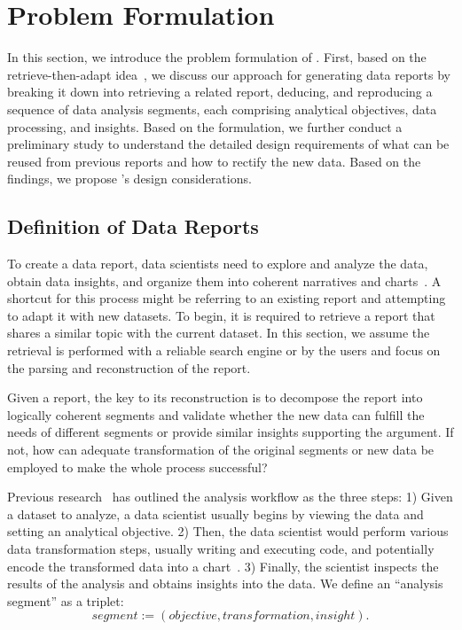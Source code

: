 

\section{Problem Formulation}

In this section, we introduce the problem formulation of \system{}. 
First, based on the retrieve-then-adapt idea~\cite{qian2020retrieve}, we discuss our approach for generating data reports by breaking it down into retrieving a related report, deducing, and reproducing a sequence of data analysis segments, each comprising analytical objectives, data processing, and insights.
Based on the formulation, we further conduct a preliminary study to understand the detailed design requirements of what can be reused from previous reports and how to rectify the new data. 
Based on the findings, we propose \system{}'s design considerations.

\subsection{Definition of Data Reports}
\label{subsec:problem_formulation}

To create a data report, data scientists need to explore and analyze the data, obtain data insights, and organize them into coherent narratives and charts~\cite{li2023wherearewesofar}. 
A shortcut for this process might be referring to an existing report and attempting to adapt it with new datasets.
To begin, it is required to retrieve a report that shares a similar topic with the current dataset.
In this section, we assume the retrieval is performed with a reliable search engine or by the users and focus on the parsing and reconstruction of the report.

Given a report, the key to its reconstruction is to decompose the report into logically coherent segments and validate whether the new data can fulfill the needs of different segments or provide similar insights supporting the argument. 
If not, how can adequate transformation of the original segments or new data be employed to make the whole process successful? 

Previous research~\cite{bar2020automatically, li2023edassistant, batch2017interactive} has outlined the analysis workflow as the three steps: 
1) Given a dataset to analyze, a data scientist usually begins by viewing the data and setting an analytical objective. 
2) Then, the data scientist would perform various data transformation steps, usually writing and executing code, and potentially encode the transformed data into a chart~\cite{wang2023dataFormulator}. 
3) Finally, the scientist inspects the results of the analysis and obtains insights into the data. 
We define an ``analysis segment''  as a triplet:
$$ segment := (objective, transformation, insight).$$

